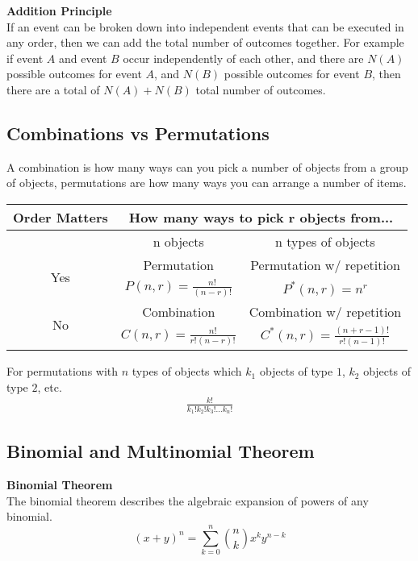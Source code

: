 \documentclass{article}
\numberwithin{theorem}{subsection}
\numberwithin{theorem}{subsubsection}
\theoremstyle{definition}
\numberwithin{definition}{subsection}
\numberwithin{definition}{subsubsection}
\begin{document}
\noindent \textbf{Addition Principle} \\
\indent If an event can be broken down into independent events that can be executed in any order, then we can add the total number of outcomes together. For example if event $A$ and event $B$ occur independently of each other, and there are $N(A)$ possible outcomes for event $A$, and $N(B)$ possible outcomes for event $B$, then there are a total of $N(A) + N(B)$ total number of outcomes.

\subsection{Combinations vs Permutations}
A combination is how many ways can you pick a number of objects from a group of objects, permutations are how many ways you can arrange a number of items.

\begin{table}[H]
    \centering
    \begin{tabular}{c | c | c}
        Order Matters & \multicolumn{2}{c}{How many ways to pick r objects from...}\\
        \hline
         & n objects & n types of objects \\
         \hline
        \multirow{2}{*}{Yes} & Permutation & Permutation w/ repetition \\
        & $P(n,r) = \frac{n!}{(n-r)!}$ & $P^{*}(n,r) = n^{r}$ \\
        \hline
        \multirow{2}{*}{No} & Combination & Combination w/ repetition \\
        & $C(n,r) = \frac{n!}{r!(n-r)!}$ & $C^{*}(n,r) = \frac{(n+r-1)!}{r!(n-1)!}$ \\
    \end{tabular}
    \label{tab:my_label}
\end{table}

\noindent For permutations with $n$ types of objects which $k_{1}$ objects of type $1$, $k_{2}$ objects of type $2$, etc. 
\begin{gather*}
    \frac{k!}{k_{1}!k_{2}!k_{3}!...k_{n}!}
\end{gather*}

\subsection{Binomial and Multinomial Theorem}

\noindent \textbf{Binomial Theorem} \\
\indent The binomial theorem describes the algebraic expansion of powers of any binomial.
\begin{equation*}
    (x+y)^{n} = \sum_{k=0}^{n} {n\choose k} x^{k}y^{n-k}
\end{equation*}
\\
\end{document}

